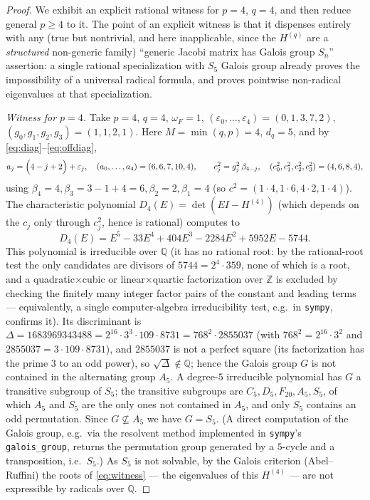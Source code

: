 \documentclass[12pt]{article}
\theoremstyle{definition}
\theoremstyle{remark}
\begin{document}
\begin{proof}
We exhibit an explicit rational witness for $p=4$, $q=4$, and then reduce general
$p\ge4$ to it. The point of an explicit witness is that it dispenses entirely with
any (true but nontrivial, and here inapplicable, since the $H^{(q)}$ are a
\emph{structured} non-generic family) ``generic Jacobi matrix has Galois group
$S_n$'' assertion: a single rational specialization with $S_5$ Galois group already
proves the impossibility of a universal radical formula, and proves pointwise
non-radical eigenvalues at that specialization.

\emph{Witness for $p=4$.} Take $p=4$, $q=4$, $\omega_F=1$,
$(\varepsilon_0,\dots,\varepsilon_4)=(0,1,3,7,2)$, $(g_0,g_1,g_2,g_3)=(1,1,2,1)$.
Here $M=\min(q,p)=4$, $d_q=5$, and by \eqref{eq:diag}--\eqref{eq:offdiag},
\[
a_j=\Bigl(4-j+2\Bigr)+\varepsilon_j,\quad
(a_0,\dots,a_4)=(6,6,7,10,4),\qquad
c_j^2=g_j^2\,\beta_{4-j},\quad (c_0^2,c_1^2,c_2^2,c_3^2)=(4,6,8,4),
\]
using $\beta_4=4,\beta_3=3{-}1{+}4=6,\beta_2=2,\beta_1=4$ (so
$c^2=(1\cdot4,1\cdot6,4\cdot2,1\cdot4)$). The characteristic polynomial
$D_4(E)=\det(EI-H^{(4)})$ (which depends on the $c_j$ only through $c_j^2$, hence is
rational) computes to
\begin{equation}\label{eq:witness}
D_4(E)=E^{5}-33E^{4}+404E^{3}-2284E^{2}+5952E-5744 .
\end{equation}
This polynomial is irreducible over $\mathbb Q$ (it has no rational root: by the
rational-root test the only candidates are divisors of $5744=2^4\cdot359$, none of
which is a root, and a quadratic$\times$cubic or linear$\times$quartic factorization
over $\mathbb Z$ is excluded by checking the finitely many integer factor pairs of
the constant and leading terms — equivalently, a single computer-algebra
irreducibility test, e.g.\ in \texttt{sympy}, confirms it). Its discriminant is
$\Delta=1683969343488=2^{16}\cdot 3^{3}\cdot 109\cdot 8731 = 768^2\cdot 2855037$
(with $768^2=2^{16}\cdot3^2$ and $2855037=3\cdot109\cdot8731$), and
$2855037$ is not a perfect square (its factorization has the prime $3$ to an odd power), so $\sqrt\Delta\notin\mathbb Q$; hence the Galois
group $G$ is not contained in the alternating group $A_5$. A degree-$5$ irreducible
polynomial has $G$ a transitive subgroup of $S_5$; the transitive subgroups are
$C_5,D_5,F_{20},A_5,S_5$, of which $A_5$ and $S_5$ are the only ones not contained in
$A_5$, and only $S_5$ contains an odd permutation. Since $G\not\subseteq A_5$ we have
$G=S_5$. (A direct computation of the Galois group, e.g.\ via the resolvent method
implemented in \texttt{sympy}'s \texttt{galois\_group}, returns the permutation group
generated by a $5$-cycle and a transposition, i.e.\ $S_5$.) As $S_5$ is not solvable,
by the Galois criterion (Abel--Ruffini) the roots of \eqref{eq:witness} — the
eigenvalues of this $H^{(4)}$ — are not expressible by radicals over $\mathbb Q$.


\end{proof}
\end{document}
